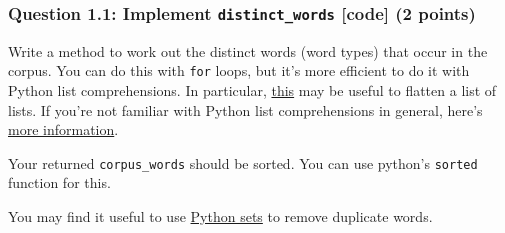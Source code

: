 \documentclass[11pt]{article}
\begin{document}
    \subsubsection{\texorpdfstring{Question 1.1: Implement
\texttt{distinct\_words} {[}code{]} (2
points)}{Question 1.1: Implement distinct\_words {[}code{]} (2 points)}}\label{question-1.1-implement-distinct_words-code-2-points}

Write a method to work out the distinct words (word types) that occur in
the corpus. You can do this with \texttt{for} loops, but it's more
efficient to do it with Python list comprehensions. In particular,
\href{https://coderwall.com/p/rcmaea/flatten-a-list-of-lists-in-one-line-in-python}{this}
may be useful to flatten a list of lists. If you're not familiar with
Python list comprehensions in general, here's
\href{https://python-3-patterns-idioms-test.readthedocs.io/en/latest/Comprehensions.html}{more
information}.

Your returned \texttt{corpus\_words} should be sorted. You can use
python's \texttt{sorted} function for this.

You may find it useful to use
\href{https://www.w3schools.com/python/python_sets.asp}{Python sets} to
remove duplicate words.
\end{document}
